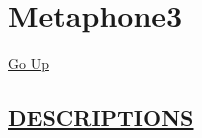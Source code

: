 \chapter*{\color{headfile}
Metaphone3
}
\hypertarget{ecldoc:toc:Metaphone3}{}
\hyperlink{ecldoc:toc:root}{Go Up}


\section*{\underline{\textsf{DESCRIPTIONS}}}
